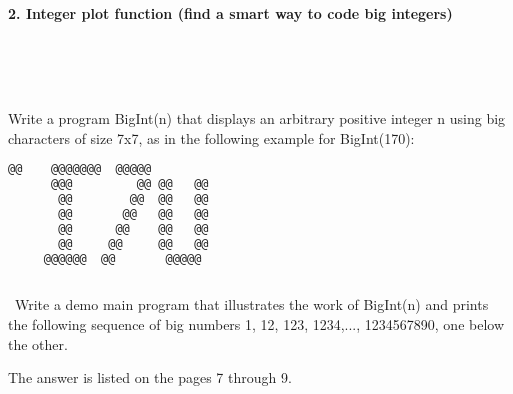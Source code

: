 \documentclass{article}
\begin{document}
	
\paragraph{}\

	
	
	\rmfamily
	
	\paragraph{2. Integer plot function (find a smart way to code big integers) }\
	
	\rmfamily\
	
		Write a program BigInt(n) that displays an arbitrary positive integer n using big characters of size 7x7, as in the following example for BigInt(170):
				
	\ttfamily
	\begin{lstlisting}[language=bash]		
	   @@ 	 @@@@@@@  @@@@@  
	  @@@  	      @@ @@   @@ 
	   @@  	     @@  @@   @@ 
	   @@  	    @@   @@   @@ 
	   @@  	   @@    @@   @@ 
	   @@  	  @@     @@   @@ 
	 @@@@@@	 @@       @@@@@  
		 
	\end{lstlisting}
	
	\rmfamily\
	Write a demo main program that illustrates the work of BigInt(n) and prints the following sequence of big numbers 1, 12, 123, 1234,..., 1234567890, one below the other.
	\newline
	
	The answer is listed on the pages 7 through 9.
	
	
\paragraph{}\
\paragraph{}\
\paragraph{}\
\paragraph{}\
\paragraph{}\
\paragraph{}\
\end{document}

